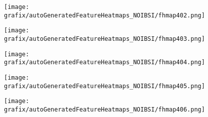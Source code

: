 \hspace{\hsp} 
\begin{subfigure}{\wid\textwidth} 
    \centering 
    \caption{\tiny \sffamily {}} 
    \vspace{\vsp} 
    \texttt{[image: grafix/autoGeneratedFeatureHeatmaps\_NOIBSI/fhmap402.png]} 
\end{subfigure} 
\hspace{\hsp} 
\begin{subfigure}{\wid\textwidth} 
    \centering 
    \caption{\tiny \sffamily {}} 
    \vspace{\vsp} 
    \texttt{[image: grafix/autoGeneratedFeatureHeatmaps\_NOIBSI/fhmap403.png]} 
\end{subfigure} 
\hspace{\hsp} 
\begin{subfigure}{\wid\textwidth} 
    \centering 
    \caption{\tiny \sffamily {}} 
    \vspace{\vsp} 
    \texttt{[image: grafix/autoGeneratedFeatureHeatmaps\_NOIBSI/fhmap404.png]} 
\end{subfigure} 
\hspace{\hsp} 
\begin{subfigure}{\wid\textwidth} 
    \centering 
    \caption{\tiny \sffamily {}} 
    \vspace{\vsp} 
    \texttt{[image: grafix/autoGeneratedFeatureHeatmaps\_NOIBSI/fhmap405.png]} 
\end{subfigure} 
\hspace{\hsp} 
\begin{subfigure}{\wid\textwidth} 
    \centering 
    \caption{\tiny \sffamily {}} 
    \vspace{\vsp} 
    \texttt{[image: grafix/autoGeneratedFeatureHeatmaps\_NOIBSI/fhmap406.png]} 
\end{subfigure} 
\hspace{\hsp} 
